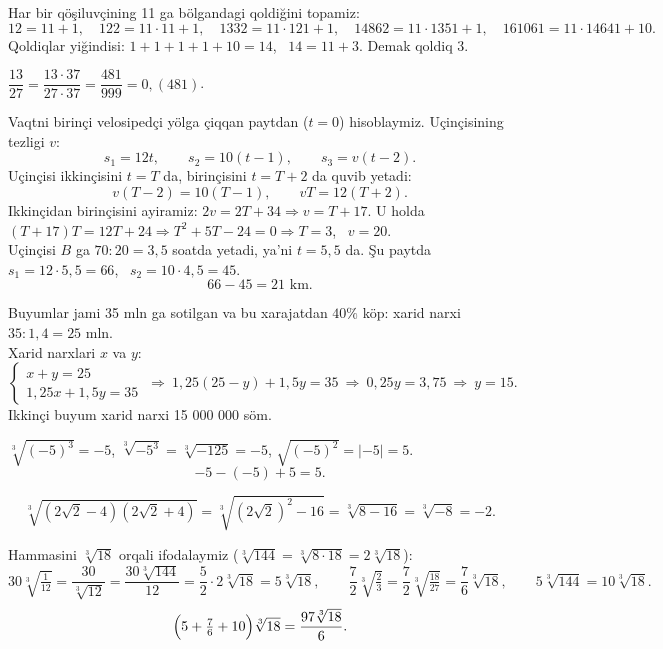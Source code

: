 




Har bir qöşiluvçining 11 ga bölgandagi qoldiğini topamiz:
\[12=11+1,\quad 122=11\cdot11+1,\quad 1332=11\cdot121+1,\quad 14862=11\cdot1351+1,\quad 161061=11\cdot14641+10.\]
Qoldiqlar yiğindisi: $1+1+1+1+10=14$, \ $14=11+3$. Demak qoldiq 3.

$\dfrac{13}{27}=\dfrac{13\cdot37}{27\cdot37}=\dfrac{481}{999}=0{,}(481)$.

Vaqtni birinçi velosipedçi yölga çiqqan paytdan ($t=0$) hisoblaymiz. Uçinçisining tezligi $v$:
\[s_1=12t,\qquad s_2=10(t-1),\qquad s_3=v(t-2).\]
Uçinçisi ikkinçisini $t=T$ da, birinçisini $t=T+2$ da quvib yetadi:
\[v(T-2)=10(T-1),\qquad vT=12(T+2).\]
Ikkinçidan birinçisini ayiramiz: $2v=2T+34\Rightarrow v=T+17$. U holda $(T+17)T=12T+24\Rightarrow T^2+5T-24=0\Rightarrow T=3$, \ $v=20$.\\
Uçinçisi $B$ ga $70:20=3{,}5$ soatda yetadi, ya'ni $t=5{,}5$ da. Şu paytda $s_1=12\cdot5{,}5=66$, \ $s_2=10\cdot4{,}5=45$.
\[66-45=21 \text{ km}.\]

Buyumlar jami 35 mln ga sotilgan va bu xarajatdan $40\%$ köp: xarid narxi $35:1{,}4=25$ mln.\\
Xarid narxlari $x$ va $y$:
\[\begin{cases}x+y=25\\ 1{,}25x+1{,}5y=35\end{cases}\ \Rightarrow\ 1{,}25(25-y)+1{,}5y=35\ \Rightarrow\ 0{,}25y=3{,}75\ \Rightarrow\ y=15.\]
Ikkinçi buyum xarid narxi 15 000 000 söm.

$\sqrt[3]{(-5)^3}=-5$, \quad $\sqrt[3]{-5^3}=\sqrt[3]{-125}=-5$, \quad $\sqrt{(-5)^2}=|-5|=5$.
\[-5-(-5)+5=5.\]

\[\sqrt[3]{(2\sqrt2-4)(2\sqrt2+4)}=\sqrt[3]{(2\sqrt2)^2-16}=\sqrt[3]{8-16}=\sqrt[3]{-8}=-2.\]

Hammasini $\sqrt[3]{18}$ orqali ifodalaymiz ($\sqrt[3]{144}=\sqrt[3]{8\cdot18}=2\sqrt[3]{18}$):
\[30\sqrt[3]{\tfrac1{12}}=\frac{30}{\sqrt[3]{12}}=\frac{30\sqrt[3]{144}}{12}=\frac52\cdot2\sqrt[3]{18}=5\sqrt[3]{18},\qquad
\frac72\sqrt[3]{\tfrac23}=\frac72\sqrt[3]{\tfrac{18}{27}}=\frac76\sqrt[3]{18},\qquad 5\sqrt[3]{144}=10\sqrt[3]{18}.\]
\[\Bigl(5+\tfrac76+10\Bigr)\sqrt[3]{18}=\frac{97\sqrt[3]{18}}6.\]

